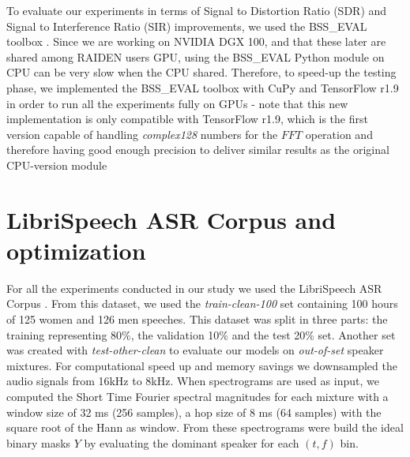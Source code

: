 \documentclass[master, tikz, final,11pt, dvipdfmx]{iscs-thesis}
\begin{document}
To evaluate our experiments in terms of Signal to Distortion Ratio (SDR) and Signal to Interference Ratio (SIR) improvements, we used the BSS\_EVAL toolbox \cite{BSS}. Since we are working on NVIDIA DGX 100, and that these later are shared among RAIDEN users GPU, using the BSS\_EVAL Python module on CPU can be  very slow when the CPU shared. Therefore, to speed-up the testing phase, we implemented the BSS\_EVAL toolbox with CuPy \cite{cupy} and TensorFlow r1.9 in order to run all the experiments fully on GPUs - note that this new implementation is only compatible with TensorFlow r1.9, which is the first version capable of handling \textit{complex128} numbers for the $FFT$ operation and therefore having good enough precision to deliver similar results as the original CPU-version module

\section{LibriSpeech ASR Corpus and optimization}
For all the experiments conducted in our study we used the LibriSpeech ASR Corpus \cite{LIBRI}. From this dataset, we used the \textit{train-clean-100} set containing 100 hours of 125 women and 126 men speeches. This dataset was split in three parts: the training representing 80\%, the validation 10\% and the test 20\% set. Another set was created with \textit{test-other-clean} to evaluate our models on \textit{out-of-set} speaker mixtures. For computational speed up and memory savings we downsampled the audio signals from 16kHz to 8kHz.
When spectrograms are used as input, we computed the Short Time Fourier spectral magnitudes for each mixture with a window size of 32 ms (256 samples), a hop size of 8 ms (64 samples) with the square root of the Hann as window. From these spectrograms were build the ideal binary masks $Y$ by evaluating the dominant speaker for each $(t,f)$ bin.
\end{document}
